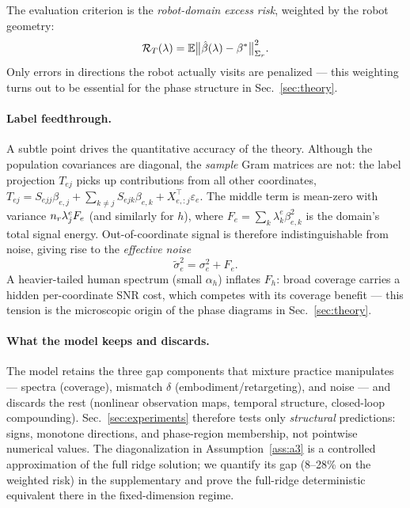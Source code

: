 The evaluation criterion is the \emph{robot-domain excess risk}, weighted by the robot geometry:
\begin{equation}
  \mathcal{R}_T(\lambda) = \mathbb{E}\big\| \hat\beta(\lambda) - \beta^* \big\|^2_{\Sigma_r}.
  \label{eq:risk}
\end{equation}
Only errors in directions the robot actually visits are penalized --- this weighting turns out to be essential for the phase structure in Sec.~\ref{sec:theory}.

\paragraph{Label feedthrough.}
A subtle point drives the quantitative accuracy of the theory.
Although the population covariances are diagonal, the \emph{sample} Gram matrices are not: the label projection $T_{ej}$ picks up contributions from all other coordinates, $T_{ej} = S_{ejj}\beta_{e,j} + \sum_{k\neq j} S_{ejk}\beta_{e,k} + X_{e,:j}^\top\varepsilon_e$.
The middle term is mean-zero with variance $n_r\lambda^e_j F_e$ (and similarly for $h$), where $F_e = \sum_k \lambda^e_k\beta_{e,k}^2$ is the domain's total signal energy.
Out-of-coordinate signal is therefore indistinguishable from noise, giving rise to the \emph{effective noise}
\begin{equation}
  \tilde\sigma_e^2 = \sigma_e^2 + F_e .
  \label{eq:feedthrough}
\end{equation}
A heavier-tailed human spectrum (small $\alpha_h$) inflates $F_h$: broad coverage carries a hidden per-coordinate SNR cost, which competes with its coverage benefit --- this tension is the microscopic origin of the phase diagrams in Sec.~\ref{sec:theory}.

\paragraph{What the model keeps and discards.}
The model retains the three gap components that mixture practice manipulates --- spectra (coverage), mismatch $\delta$ (embodiment/retargeting), and noise --- and discards the rest (nonlinear observation maps, temporal structure, closed-loop compounding).
Sec.~\ref{sec:experiments} therefore tests only \emph{structural} predictions: signs, monotone directions, and phase-region membership, not pointwise numerical values.
The diagonalization in Assumption~\ref{ass:a3} is a controlled approximation of the full ridge solution; we quantify its gap (8--28\% on the weighted risk) in the supplementary and prove the full-ridge deterministic equivalent there in the fixed-dimension regime.
